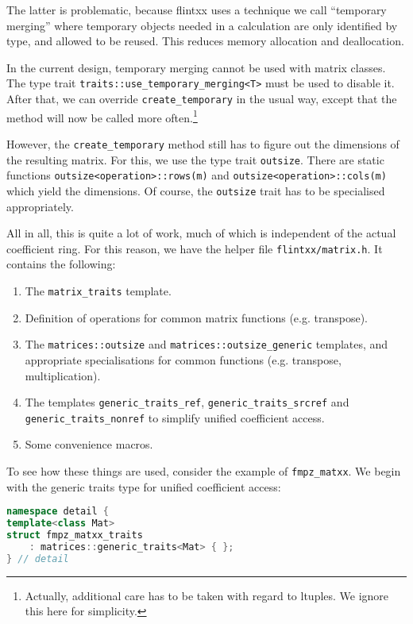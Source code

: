 \documentclass[a4paper,10pt]{book}
\newcommand{\code}{\lstinline}
\begin{document}
{{The latter is problematic, because flintxx uses a technique we call ``temporary
merging'' where temporary objects needed in a calculation are only identified by
type, and allowed to be reused. This reduces memory allocation and deallocation.

In the current design, temporary merging cannot be used with matrix classes. The
type trait \code{traits::use_temporary_merging<T>} must be used to disable it.
After that, we can override \code{create_temporary} in the usual way, except
that the method will now be called more often.\footnote{Actually, additional care
has to be taken with regard to ltuples. We ignore this here for simplicity.}

However, the \code{create_temporary} method still has to figure out the
dimensions of the resulting matrix. For this, we use the type trait
\code{outsize}. There are static functions \code{outsize<operation>::rows(m)}
and \code{outsize<operation>::cols(m)} which yield the dimensions. Of course,
the \code{outsize} trait has to be specialised appropriately.

All in all, this is quite a lot of work, much of which is independent of the
actual coefficient ring. For this reason, we have the helper file
\code{flintxx/matrix.h}. It contains the following:
\begin{enumerate}
  \item The \code{matrix_traits} template.
  \item Definition of operations for common matrix functions (e.g. transpose).
  \item The \code{matrices::outsize} and \code{matrices::outsize_generic}
        templates, and appropriate specialisations for common functions
        (e.g. transpose, multiplication).
  \item The templates \code{generic_traits_ref}, \code{generic_traits_srcref}
        and \code{generic_traits_nonref} to simplify unified coefficient access.
  \item Some convenience macros.
\end{enumerate}

To see how these things are used, consider the example of \code{fmpz_matxx}.
We begin with the generic traits type for unified coefficient access:

\begin{lstlisting}[language=c++]
namespace detail {
template<class Mat>
struct fmpz_matxx_traits
    : matrices::generic_traits<Mat> { };
} // detail
\end{lstlisting}

}}
\end{document}

